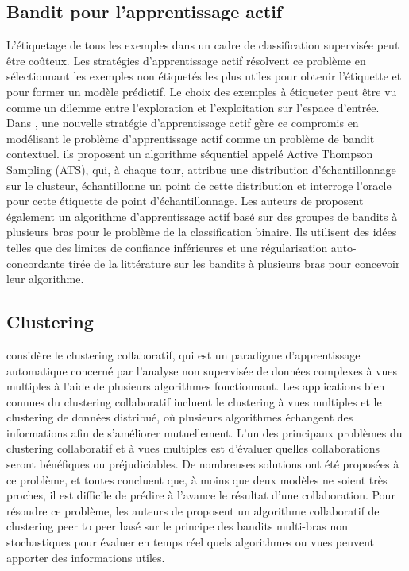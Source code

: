 \documentclass[conference]{IEEEtran}
\newcommand{\1}[1]{\mathbbm{1}_{\left\{#1\right\}}}
\begin{document}
\subsection{Bandit pour l'apprentissage actif}
L'étiquetage de tous les exemples dans un cadre de classification supervisée peut être coûteux. Les stratégies d'apprentissage actif résolvent ce problème en sélectionnant les exemples non étiquetés les plus utiles pour obtenir l'étiquette et pour former un modèle prédictif. Le choix des exemples à étiqueter peut être vu comme un dilemme entre l'exploration et l'exploitation sur l'espace d'entrée. Dans \cite{bouneffouf2014contextual}, une nouvelle stratégie d'apprentissage actif gère ce compromis en modélisant le problème d'apprentissage actif comme un problème de bandit contextuel.
ils proposent un algorithme séquentiel appelé Active Thompson Sampling (ATS), qui, à chaque tour, attribue une distribution d'échantillonnage sur le clusteur, échantillonne un point de cette distribution et interroge l'oracle pour cette étiquette de point d'échantillonnage. Les auteurs de \cite{ganti2013building} proposent également un algorithme d'apprentissage actif basé sur des groupes de bandits à plusieurs bras pour le problème de la classification binaire. Ils utilisent des idées telles que des limites de confiance inférieures et une régularisation auto-concordante tirée de la littérature sur les bandits à plusieurs bras pour concevoir leur algorithme. 

\subsection{Clustering}
\cite{SublimeL18} considère le clustering collaboratif, qui est un paradigme d'apprentissage automatique concerné par l'analyse non supervisée de données complexes à vues multiples à l'aide de plusieurs algorithmes fonctionnant. Les applications bien connues du clustering collaboratif incluent le clustering à vues multiples et le clustering de données distribué, où plusieurs algorithmes échangent des informations afin de s'améliorer mutuellement. L'un des principaux problèmes du clustering collaboratif et à vues multiples est d'évaluer quelles collaborations seront bénéfiques ou préjudiciables. De nombreuses solutions ont été proposées à ce problème, et toutes concluent que, à moins que deux modèles ne soient très proches, il est difficile de prédire à l'avance le résultat d'une collaboration. Pour résoudre ce problème, les auteurs de \cite{SublimeL18} proposent un algorithme collaboratif de clustering peer to peer basé sur le principe des bandits multi-bras non stochastiques pour évaluer en temps réel quels algorithmes ou vues peuvent apporter des informations utiles.
\end{document}
